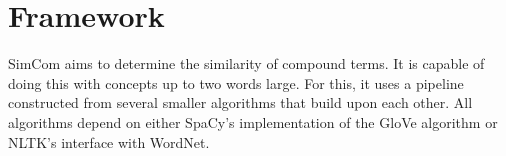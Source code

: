 \documentclass{article}
\begin{document}




\section{Framework} \label{sec:framework}

SimCom aims to determine the similarity of compound terms. It is capable of doing this with concepts up to two words large. For this, it uses a pipeline constructed from several smaller algorithms that build upon each other. All algorithms depend on either SpaCy's implementation of the GloVe algorithm or NLTK's interface with WordNet.
\end{document}
